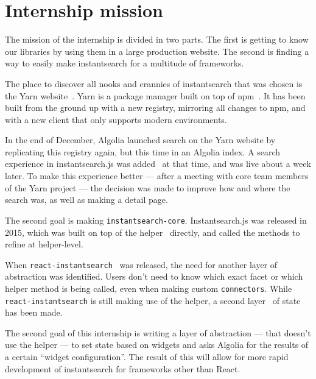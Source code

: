
\chapter{Internship mission} %
\label{chp:mission}

The mission of the internship is divided in two parts. The first is getting to know our libraries by using them in a large production website. The second is finding a way to easily make instantsearch for a multitude of frameworks.

The place to discover all nooks and crannies of instantsearch that was chosen is the Yarn website~\cite{yarn-site}. Yarn is a package manager built on top of npm~\cite{npm-github}. It has been built from the ground up with a new registry, mirroring all changes to npm, and with a new client that only supports modern environments.

In the end of December, Algolia launched search on the Yarn website by replicating this registry again, but this time in an Algolia index. A search experience in instantsearch.js was added~\cite{yarn-pr-add-algolia} at that time, and was live about a week later. To make this experience better --- after a meeting with core team members of the Yarn project --- the decision was made to improve how and where the search was, as well as making a detail page.

The second goal is making {\tt instantsearch-core}. Instantsearch.js was released in 2015, which was built on top of the helper~\cite{algolia-js-helper} directly, and called the methods to refine at helper-level.

When {\tt react-instantsearch}~\cite{react-instantsearch} was released, the need for another layer of abstraction was identified. Users don't need to know which exact facet or which helper method is being called, even when making custom {\tt connectors}\cite{react-instantsearch-connectors}. While {\tt react-instantsearch} is still making use of the helper, a second layer~\cite{react-instantsearch-search-state} of state has been made.

The second goal of this internship is writing a layer of abstraction --- that doesn't use the helper --- to set state based on widgets and asks Algolia for the results of a certain ``widget configuration''. The result of this will allow for more rapid development of instantsearch for frameworks other than React.
